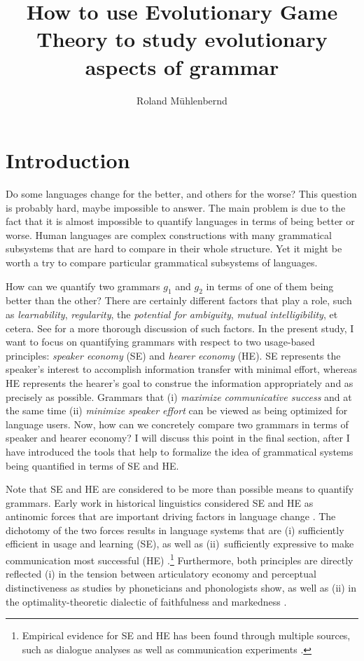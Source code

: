 \documentclass[output=paper,hidelinks]{langscibook}
\author{Roland Mühlenbernd\affiliation{Leibniz-Centre General Linguistics (ZAS), Berlin; Nicolaus Copernicus University, Toruń}}
\title[How to use EGT to study evolutionary aspects of grammar]{How to use Evolutionary Game Theory to study evolutionary aspects of grammar}
\begin{document}
\maketitle
\section{Introduction} 
\label{sec:intro}

Do some languages change for the better, and others for the worse? This question is probably hard, maybe impossible to answer. The main problem is due to the fact that it is almost impossible to quantify languages in terms of being better or worse. Human languages are  complex constructions with many grammatical subsystems that are hard to compare in their whole structure. Yet it might be worth a try to compare particular grammatical subsystems of languages.

How can we quantify two grammars $g_1$ and $g_2$ in terms of one of them being better than the other? There are certainly different factors that play a role, such as \emph{learnability}, \emph{regularity}, the \emph{potential for ambiguity}, \emph{mutual intelligibility}, et cetera. See
for a more thorough discussion of such factors.
In the present study, I want to focus on quantifying grammars with respect to two usage-based principles: \emph{speaker economy} (SE) and \emph{hearer economy} (HE).  SE represents the speaker's interest to accomplish information transfer with minimal effort, whereas HE represents the hearer's goal to construe the information appropriately and as precisely as possible. Grammars that (i) \emph{maximize communicative success} and at the same time (ii) \emph{minimize speaker effort} can be viewed as being optimized for language users. Now, how can we concretely compare two grammars in terms of speaker and hearer economy? I will discuss this point in the final section, after I have introduced the tools that help to formalize the idea of grammatical systems being quantified in terms of SE and HE.

Note that SE and HE are considered to be more than possible means to quantify grammars. Early work in historical linguistics considered SE and HE as antinomic forces that are important driving factors in language change \citep{paul_1888,Zipf49,martinet_1962}. The dichotomy of the two forces results in language systems that are (i) sufficiently efficient in usage and learning (SE), as well as (ii)~sufficiently expressive to make communication most successful (HE) \citep{horn84}.\footnote{Empirical evidence for SE and HE has been found through multiple sources, such as dialogue analyses \citep{Geluykens_2013} as well as communication experiments \citep{Rubin_2015}.} Furthermore, both principles are directly reflected (i) in the tension between articulatory economy and perceptual distinctiveness as studies by phoneticians and phonologists \citep{Lindblom_1983} show, as well as (ii) in the optimality-theoretic dialectic of faithfulness and markedness \citep{Horn_2006}.\largerpage
\end{document}
